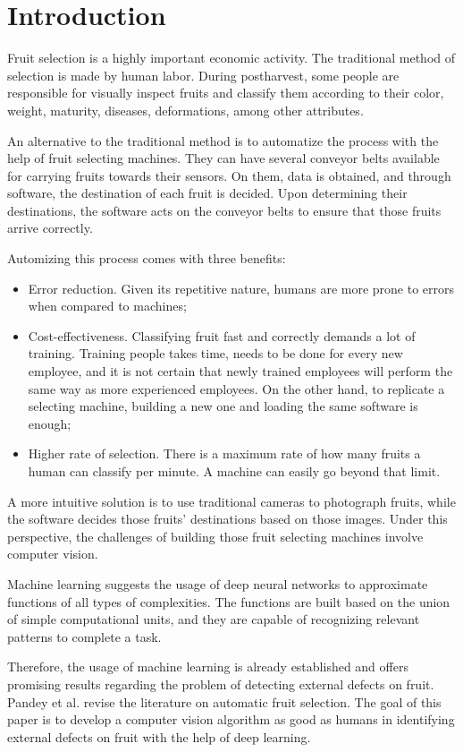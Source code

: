 \documentclass[../main.tex]{subfile}
\begin{document}
\section{Introduction} \label{sec:introduction}
Fruit selection is a highly important economic activity. The traditional method of selection is made by human labor. During postharvest, some people are responsible for visually inspect fruits and classify them according to their color, weight, maturity, diseases, deformations, among other attributes.

An alternative to the traditional method is to automatize the process with the help of fruit selecting machines. They can have several conveyor belts available for carrying fruits towards their sensors. On them, data is obtained, and through software, the destination of each fruit is decided. Upon determining their destinations, the software acts on the conveyor belts to ensure that those fruits arrive correctly.

Automizing this process comes with three benefits:
\begin{itemize}
    \item Error reduction. Given its repetitive nature, humans are more prone to errors when compared to machines;

    \item Cost-effectiveness. Classifying fruit fast and correctly demands a lot of training. Training people takes time, needs to be done for every new employee, and it is not certain that newly trained employees will perform the same way as more experienced employees. On the other hand, to replicate a selecting machine, building a new one and loading the same software is enough;

    \item Higher rate of selection. There is a maximum rate of how many fruits a human can classify per minute. A machine can easily go beyond that limit.
\end{itemize}

A more intuitive solution is to use traditional cameras to photograph fruits, while the software decides those fruits' destinations based on those images. Under this perspective, the challenges of building those fruit selecting machines involve computer vision.

Machine learning suggests the usage of deep neural networks to approximate functions of all types of complexities. The functions are built based on the union of simple computational units, and they are capable of recognizing relevant patterns to complete a task.

Therefore, the usage of machine learning is already established and offers promising results regarding the problem of detecting external defects on fruit. Pandey et al. \cite{I-item1} revise the literature on automatic fruit selection. The goal of this paper is to develop a computer vision algorithm as good as humans in identifying external defects on fruit with the help of deep learning.
\end{document}
